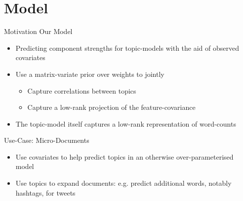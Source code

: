 \documentclass[xcolor=dvipsnames]{beamer}
\newcommand \vecf[1] {
    \text{vec}\left(#1\right)
}
\newcommand \halve[1] {
	\frac{#1}{2}
}
\newcommand \half {
    \halve{1}
}
\newcommand \tr { \text{tr} }
\newcommand \T { ^\top }
\newcommand \nor[2]   { \mathcal{N} \left( {#1}, {#2} \right) }
\newcommand \mnor[3]  { \mathcal{N} \left(#1, #2, #3\right) }
\newcommand \Tr[1]   { \tr \left(  {#1}  \right) }
\newcommand \MReal[2] { { \mathbb{R}^{#1 \times #2} } }
\newcommand \inv[1] { {#1}^{-1} }
\begin{document}
%
%
%
%
%
%





\section{Model}
\begin{frame}{Motivation}
Our Model

\begin{itemize}
    \item Predicting component strengths for topic-models with the aid of observed covariates
    \item Use a matrix-variate prior over weights to jointly
    \begin{itemize}
        \item Capture correlations between topics
        \item Capture a low-rank projection of the feature-covariance      
    \end{itemize}
    \item The topic-model itself captures a low-rank representation of word-counts  
\end{itemize}

\pause
Use-Case: Micro-Documents
\begin{itemize}
    \item Use covariates to help predict topics in an otherwise over-parameterised model
    \item Use topics to expand documents: e.g. predict additional words, notably hashtags, for tweets 
\end{itemize}

\end{frame}
\end{document}
